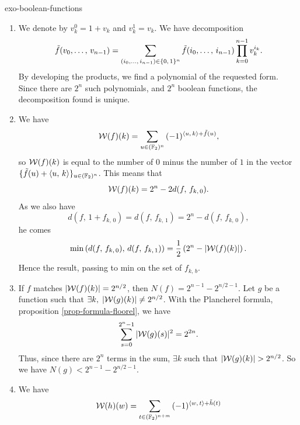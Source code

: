  
\begin{correction}{exo-boolean-functions}
\begin{enumerate}
\item We denote by $ v_k^0 = 1 + v_k $ and $ v_k^1 = v_k $. We have decomposition
\begin{equation*}
\tilde{f} (v_0, \ldots, \, v_{n-1}) = \sum_{(i_0, \ldots, \, i_{n-1}) \in \{0, \, 1\}^n}{\tilde{f} (i_0, \ldots, \, i_{n-1}) \prod_{k = 0}^{n-1}{v_k^{i_k}}}.
\end{equation*}
By developing the products, we find a polynomial of the requested form. Since there are $ 2^n $ such polynomials, and $ 2^n $ boolean functions, the decomposition found is unique.
\item We have
\begin{equation*}
\mathcal{W} (f) (k) = \sum_{u \in (\mathbb{F}_2)^n}{(-1)^{\langle u,\,k\rangle + \tilde{f} (u)}},
\end{equation*}
so $ \mathcal{W} (f) (k) $ is equal to the number of $ 0 $ minus the number of $ 1 $ in the vector $ \{\tilde{f} (u) + \langle u,\,k\rangle\}_{u \in (\mathbb{F}_2)^n} $. This means that
\begin{equation*}
\mathcal{W} (f) (k) = 2^n - 2 d (f, \, f_{k, \, 0}).
\end{equation*}
As we also have
\begin{equation*}
d (f, \, 1 + f_{k, \, 0}) = d (f, \, f_{k, \, 1}) = 2^n - d (f, \, f_{k, \, 0}),
\end{equation*}
he comes
\begin{equation*}
\min \left(d (f, \, f_{k, \, 0}), \, d (f, \, f_{k, \, 1}) \right) = \frac{1}{2} \left(2^n - | \mathcal{W} (f) (k) | \right).
\end{equation*}
Hence the result, passing to min on the set of $ f_{k, \, b} $.
\item If $ f $ matches $ | \mathcal{W} (f) (k) | = 2^{n/2} $, then $ N (f) = 2^{n-1} -2^{n/2-1} $. Let $ g $ be a function such that $ \exists k, \; | \mathcal{W} (g) (k) | \neq 2^{n/2} $. With the Plancherel formula, proposition \ref{prop-formula-floorel}, we have
\begin{equation*}
\sum_{s = 0}^{2^n-1}{| \mathcal{W} (g) (s) |^2} = 2^{2n}.
\end{equation*}
Thus, since there are $ 2^n $ terms in the sum, $ \exists k $ such that $ | \mathcal{W} (g) (k) | > 2^{n/2} $. So we have $ N (g) <2^{n-1} -2^{n/2-1} $.
\item {}  We have
\begin{align*}
\Ww (h) (w) & = \sum_{t \in (\FF_2)^{n + m}}{(-1)^{\dotp{w}{t} + \wt{h} (t )}} \\

\end{align*}
\end{enumerate}
\end{correction}
